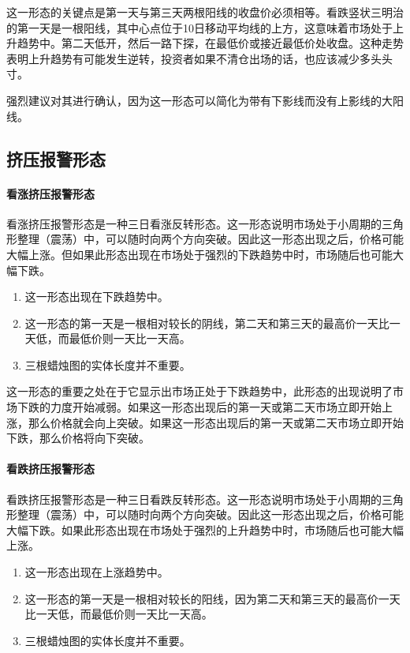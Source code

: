 这一形态的关键点是第一天与第三天两根阳线的收盘价必须相等。看跌竖状三明治的第一天是一根阳线，其中心点位于10日移动平均线的上方，这意味着市场处于上升趋势中。第二天低开，然后一路下探，在最低价或接近最低价处收盘。这种走势表明上升趋势有可能发生逆转，投资者如果不清仓出场的话，也应该减少多头头寸。

强烈建议对其进行确认，因为这一形态可以简化为带有下影线而没有上影线的大阳线。
\subsection{挤压报警形态}
\paragraph{看涨挤压报警形态} 看涨挤压报警形态是一种三日看涨反转形态。这一形态说明市场处于小周期的三角形整理（震荡）中，可以随时向两个方向突破。因此这一形态出现之后，价格可能大幅上涨。但如果此形态出现在市场处于强烈的下跌趋势中时，市场随后也可能大幅下跌。

\begin{enumerate}
    \item 这一形态出现在下跌趋势中。
    \item 这一形态的第一天是一根相对较长的阴线，第二天和第三天的最高价一天比一天低，而最低价则一天比一天高。
    \item 三根蜡烛图的实体长度并不重要。
\end{enumerate}

这一形态的重要之处在于它显示出市场正处于下跌趋势中，此形态的出现说明了市场下跌的力度开始减弱。如果这一形态出现后的第一天或第二天市场立即开始上涨，那么价格就会向上突破。如果这一形态出现后的第一天或第二天市场立即开始下跌，那么价格将向下突破。

\paragraph{看跌挤压报警形态} 看跌挤压报警形态是一种三日看跌反转形态。这一形态说明市场处于小周期的三角形整理（震荡）中，可以随时向两个方向突破。因此这一形态出现之后，价格可能大幅下跌。如果此形态出现在市场处于强烈的上升趋势中时，市场随后也可能大幅上涨。
\begin{enumerate}
    \item 这一形态出现在上涨趋势中。
    \item 这一形态的第一天是一根相对较长的阳线，因为第二天和第三天的最高价一天比一天低，而最低价则一天比一天高。
    \item 三根蜡烛图的实体长度并不重要。
\end{enumerate}

